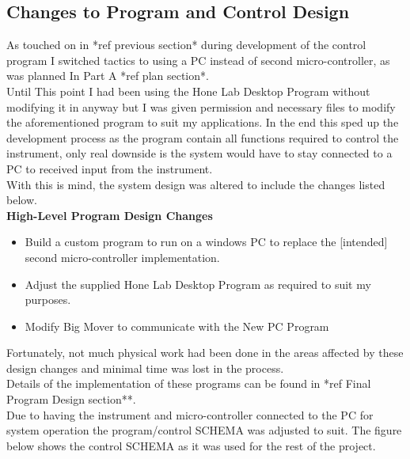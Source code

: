 \documentclass{UoNMCHA}
\numberwithin{equation}{section}
\begin{document}
\subsection{Changes to Program and Control Design}\label{sub:Changes to Final Control SCHEMA Design}
As touched on in *ref previous section* during development of the control program I switched tactics to using a PC instead of second micro-controller, as was planned In Part A *ref plan section*. \\
Until This point I had been using the Hone Lab Desktop Program without modifying it in anyway but I was given permission and necessary files to modify the aforementioned program to suit my applications. In the end this sped up the development process as the program contain all functions required to control the instrument, only real downside is the system would have to stay connected to a PC to received input from the instrument. \\
With this is mind, the system design was altered to include the changes listed below. \\
\textbf{High-Level Program Design Changes} \\
\begin{itemize}
	\item Build a custom program to run on a windows PC to replace the [intended] second micro-controller implementation.
	\item Adjust the supplied Hone Lab Desktop Program as required to suit my purposes.
	\item Modify Big Mover to communicate with the New PC Program 
\end{itemize}
Fortunately, not much physical work had been done in the areas affected by these design changes and minimal time was lost in the process. \\
Details of the implementation of these programs can be found in *ref Final Program Design section**. \\
Due to having the instrument and micro-controller connected to the PC for system operation the program/control SCHEMA was adjusted to suit. The figure below shows the control SCHEMA as it was used for the rest of the project. \\
\end{document}
